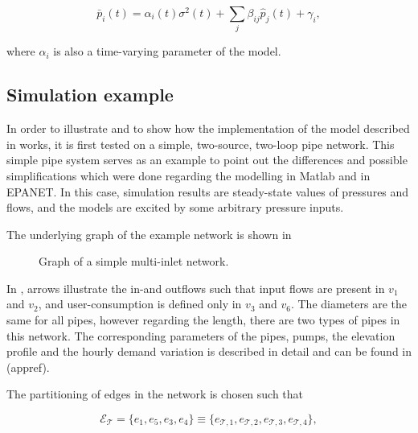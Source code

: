 \begin{equation}
\label{model_multiinlet1}
\bar{p}_i(t) = \alpha_i(t) \sigma^2(t) + \sum_j \beta_{ij} \hat{p}_j(t) + \gamma_i,
\end{equation}

where $\alpha_i$ is also a time-varying parameter of the model. 

\subsection{Simulation example}
\label{multi_inlet_network_example}

In order to illustrate and to show how the implementation of the model described in  works, it is first tested on a simple, two-source, two-loop pipe network. This simple pipe system serves as an example to point out the differences and possible simplifications which were done regarding the modelling in Matlab and in EPANET. In this case, simulation results are steady-state values of pressures and flows, and the models are excited by some arbitrary pressure inputs. 

The underlying graph of the example network is shown in 

\begin{figure}[H]
\centering
 
\caption{Graph of a simple multi-inlet network.}
\label{fig:example1_graph}
\end{figure}

\vspace{-3mm}

In , arrows illustrate the in-and outflows such that input flows are present in $v_1 $ and $v_2$, and user-consumption is defined only in $v_3$ and $v_6$. The diameters are the same for all pipes, however regarding the length, there are two types of pipes in this network. The corresponding parameters of the pipes, pumps, the elevation profile and the hourly demand variation is described in detail and can be found in (appref). 

The partitioning of edges in the network is chosen such that

\begin{equation}
  \label{edgeorientation_example1_T}
  \mathcal{E}_{\mathcal{T}} = \{ e_1, e_5, e_3, e_4 \} \equiv \{ e_{\mathcal{T},1}, e_{\mathcal{T},2}, e_{\mathcal{T},3}, e_{\mathcal{T},4}  \},
\end{equation}

